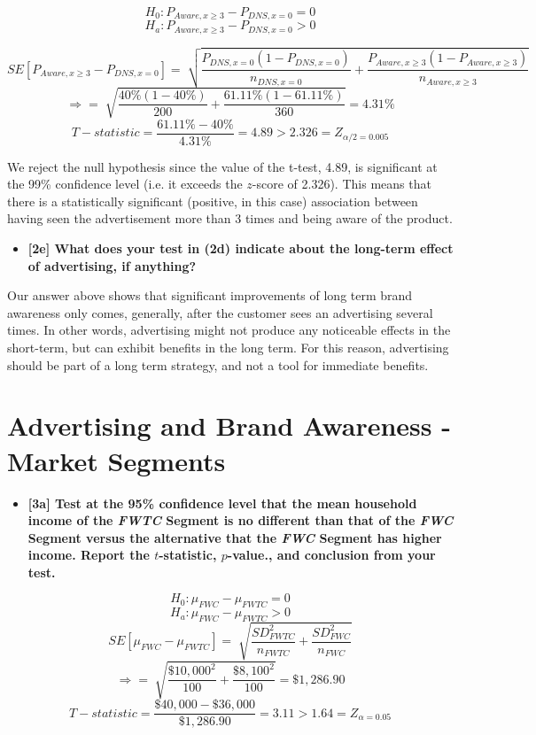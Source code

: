 \documentclass[10pt, oneside,spanish]{article}
\begin{document}
$$ H_0 : P_{Aware,x \geq 3} - P_{DNS, x=0} =  0 $$
$$ H_a : P_{Aware,x \geq 3} - P_{DNS, x=0} >  0 $$

$$ SE[P_{Aware,x \geq 3} - P_{DNS, x=0}] = \sqrt[]{\frac{P_{DNS, x=0} (1 - P_{DNS, x=0})}{n_{DNS, x=0}} + \frac{P_{Aware,x \geq 3} (1 - P_{Aware,x \geq 3})}{n_{Aware,x \geq 3}} } $$
$$ \Rightarrow = \sqrt[]{\frac{ 40\%  (1 - 40\% )}{200} + \frac{ 61.11\%  (1 - 61.11\% )}{360} } = 4.31\% $$
$$T-statistic = \frac{61.11\% - 40\%}{4.31\%} = 4.89 > 2.326  =  Z_{\alpha / 2 =0.005}  $$

We reject the null hypothesis since the value of the t-test, 4.89, is significant at the 99\% confidence level (i.e. it exceeds the $z$-score of 2.326). This means that  there is a statistically significant (positive, in this case) association between having seen the advertisement more than 3 times and being aware of the product.


\begin{itemize}
\item \textbf{ [2e]   What does your test in (2d) indicate about the long-term effect of advertising, if anything?  }
\end{itemize}

Our answer above shows that significant improvements of long term brand awareness only comes, generally, after the customer sees an advertising several times. In other words, advertising might not produce any noticeable effects in the short-term, but can exhibit benefits in the long term. For this reason, advertising should be part of a long term strategy, and not a tool for immediate benefits. 


\section{Advertising and Brand Awareness - Market Segments} 


\begin{itemize}
\item \textbf{ [3a]  Test at the 95\% confidence level that the mean household income of the \textit{FWTC} Segment is no different than that of the \textit{FWC} Segment versus the alternative that the \textit{FWC} Segment has higher income. Report the $t$-statistic, $p$-value., and conclusion from your test.   }
\end{itemize}

$$ H_0 :  \mu_{FWC} - \mu_{FWTC} =  0 $$
$$ H_a : \mu_{FWC} - \mu_{FWTC} >  0 $$
$$ SE[\mu_{FWC} - \mu_{FWTC}] = \sqrt[]{\frac{SD_{FWTC}^2}{n_{FWTC}} +  \frac{SD_{FWC}^2}{n_{FWC} }} $$
$$ \Rightarrow = \sqrt[]{\frac{ \$10,000^2}{100} + \frac{\$8,100^2 }{100} } = \$1,286.90 $$
$$T-statistic = \frac{\$40,000 - \$36,000}{ \$1,286.90} = 3.11 > 1.64 = Z_{\alpha=0.05}  $$
\end{document}
